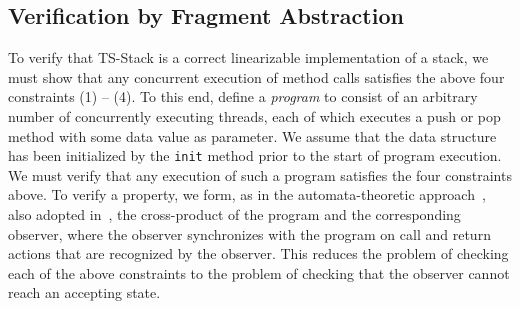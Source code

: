 \subsection{Verification by Fragment Abstraction}
To verify that TS-Stack is a correct linearizable implementation of a stack, we
must show that any concurrent execution of method calls satisfies the
above four constraints (1) -- (4).
To this end, define a {\em program} to consist 
of an arbitrary number of concurrently executing threads,
%
each of which executes a push or pop method with some data value as parameter.
We assume that the data structure has been initialized
by the {\tt init} method prior to the start of program execution.
We must verify that any execution of such a program satisfies the four
constraints above. To verify a property, 
we form, as in the automata-theoretic approach~\cite{VW:modelchecking},
also adopted in~\cite{AHHR:integrated},
the cross-product of the program  and the corresponding
observer, where the observer synchronizes with the program on call and
return actions that are recognized by the observer. This reduces the
problem of checking each of the above constraints to the problem of checking
that the observer cannot reach an accepting state.


